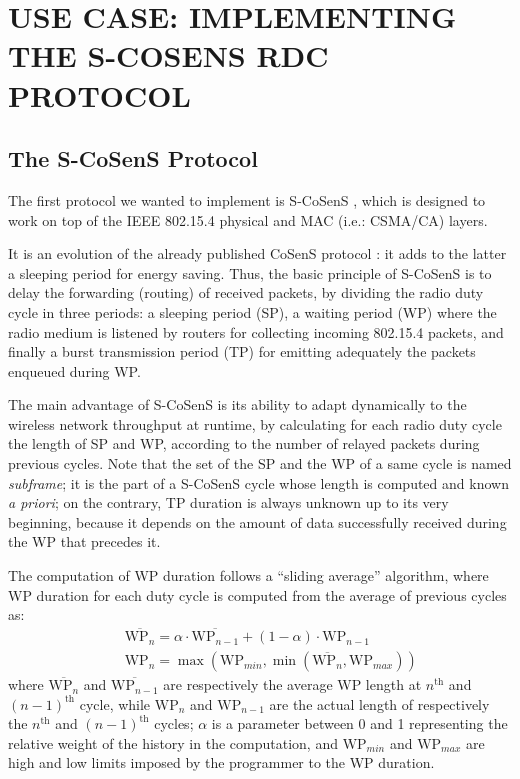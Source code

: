 \documentclass[a4paper,twoside]{article}
\begin{document}
\section{\uppercase{Use Case: implementing the S-CoSenS RDC protocol}}

\subsection{The S-CoSenS Protocol}

The first protocol we wanted to implement is S-CoSenS \cite{TheseBNefzi},
which is designed to work on top of the IEEE 802.15.4 physical and MAC
(i.e.: CSMA/CA) layers.

It is an evolution of the already published CoSenS protocol \cite{CosensConf}:
it adds to the latter a sleeping period for energy saving.
Thus, the basic principle of S-CoSenS is to delay the forwarding (routing)
of received packets, by dividing the radio duty cycle in three periods:
a sleeping period (SP), a waiting period (WP) where the radio medium
is listened by routers for collecting incoming 802.15.4 packets, and
finally a burst transmission period (TP) for emitting adequately
the packets enqueued during WP.

The main advantage of S-CoSenS is its ability to adapt dynamically to the
wireless network throughput at runtime, by calculating for each radio duty
cycle the length of SP and WP, according to the number of relayed
packets during previous cycles. Note that the set of the SP and the WP
of a same cycle is named \emph{subframe}; it is the part of a S-CoSenS
cycle whose length is computed and known \textit{a priori}; on the contrary,
TP duration is always unknown up to its very beginning, because it depends
on the amount of data successfully received during the WP that precedes it.

The computation of WP duration follows a ``sliding average'' algorithm,
where WP duration for each duty cycle is computed from the average
of previous cycles as:
\begin{eqnarray*}
&&
\overline{\mathrm{WP}_{n}} = \alpha \cdot \overline{\mathrm{WP}_{n-1}}
                + (1 - \alpha) \cdot \mathrm{WP}_{n-1}
\\ &&
\mathrm{WP}_{n} = \max ( \mathrm{WP}_{min},
                  \min ( \overline{\mathrm{WP}_{n}}, \mathrm{WP}_{max} ) )
\end{eqnarray*}
where $\overline{\mathrm{WP}_{n}}$ and $\overline{\mathrm{WP}_{n-1}}$
are respectively the average WP length at $n^{\mathrm{th}}$ and
$(n-1)^{\mathrm{th}}$ cycle, while $\mathrm{WP}_{n}$ and $\mathrm{WP}_{n-1}$
are the actual length of respectively the $n^{\mathrm{th}}$ and
$(n-1)^{\mathrm{th}}$ cycles; $\alpha$ is a parameter between 0 and 1
representing the relative weight of the history in the computation,
and $\mathrm{WP}_{min}$ and $\mathrm{WP}_{max}$ are high and low limits
imposed by the programmer to the WP duration.
\end{document}
